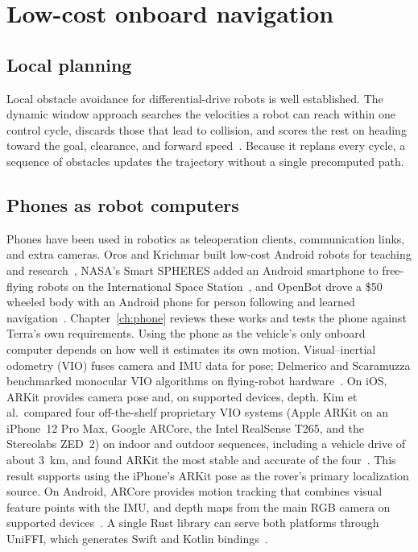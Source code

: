 \section{Low-cost onboard navigation}
\label{sec:bg-navigation}

\subsection{Local planning}

Local obstacle avoidance for differential-drive robots is well established.
The dynamic window approach searches the velocities a robot can reach within one control cycle, discards those that lead to collision, and scores the rest on heading toward the goal, clearance, and forward speed~\citep{fox1997dwa}.
Because it replans every cycle, a sequence of obstacles updates the trajectory without a single precomputed path.

\subsection{Phones as robot computers}

Phones have been used in robotics as teleoperation clients, communication links, and extra cameras.
Oros and Krichmar built low-cost Android robots for teaching and research~\citep{oros2013smartphone}, NASA's Smart SPHERES added an Android smartphone to free-flying robots on the International Space Station~\citep{fong2013smartspheres}, and OpenBot drove a \$50 wheeled body with an Android phone for person following and learned navigation~\citep{muller2021openbot}.
Chapter~\ref{ch:phone} reviews these works and tests the phone against Terra's own requirements.
Using the phone as the vehicle's only onboard computer depends on how well it estimates its own motion.
Visual--inertial odometry (VIO) fuses camera and IMU data for pose; Delmerico and Scaramuzza benchmarked monocular VIO algorithms on flying-robot hardware~\citep{delmerico2018benchmark}.
On iOS, ARKit provides camera pose and, on supported devices, depth.
Kim et al.\ compared four off-the-shelf proprietary VIO systems (Apple ARKit on an iPhone~12 Pro Max, Google ARCore, the Intel RealSense T265, and the Stereolabs ZED~2) on indoor and outdoor sequences, including a vehicle drive of about 3~km, and found ARKit the most stable and accurate of the four~\citep{kim2022benchmark}.
This result supports using the iPhone's ARKit pose as the rover's primary localization source.
On Android, ARCore provides motion tracking that combines visual feature points with the IMU, and depth maps from the main RGB camera on supported devices~\citep{arcore2026fundamentals}.
A single Rust library can serve both platforms through UniFFI, which generates Swift and Kotlin bindings~\citep{uniffi2026}.


